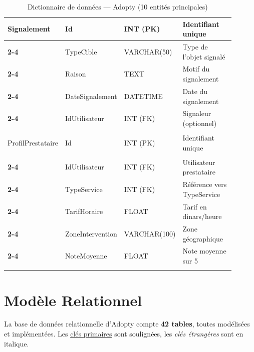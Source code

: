 \documentclass[12pt,a4paper]{report}
\begin{document}
\begin{small}
\begin{longtable}{|>{\bfseries}p{0.15\linewidth}|p{0.18\linewidth}|p{0.14\linewidth}|p{0.43\linewidth}|}
Signalement & Id & INT (PK) & Identifiant unique \\ \cline{2-4}
 & TypeCible & VARCHAR(50) & Type de l'objet signalé \\ \cline{2-4}
 & Raison & TEXT & Motif du signalement \\ \cline{2-4}
 & DateSignalement & DATETIME & Date du signalement \\ \cline{2-4}
 & IdUtilisateur & INT (FK) & Signaleur (optionnel) \\ \hline

ProfilPrestataire & Id & INT (PK) & Identifiant unique \\ \cline{2-4}
 & IdUtilisateur & INT (FK) & Utilisateur prestataire \\ \cline{2-4}
 & TypeService & INT (FK) & Référence vers TypeService \\ \cline{2-4}
 & TarifHoraire & FLOAT & Tarif en dinars/heure \\ \cline{2-4}
 & ZoneIntervention & VARCHAR(100) & Zone géographique \\ \cline{2-4}
 & NoteMoyenne & FLOAT & Note moyenne sur 5 \\ \hline

\caption{Dictionnaire de données --- Adopty (10 entités principales)}
\label{tab:dico}
\end{longtable}
\end{small}

\section{Modèle Relationnel}
\label{sec:modele-rel}

La base de données relationnelle d'Adopty compte \textbf{42 tables}, toutes modélisées et implémentées. Les \underline{clés primaires} sont soulignées, les \textit{clés étrangères} sont en italique.
\end{document}
